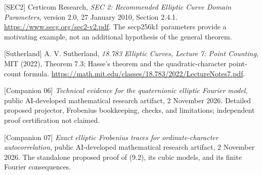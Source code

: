 \documentclass[
  11pt,
  a4paper,
]{article}
\begin{document}
{[}SEC2{]} Certicom Research, \emph{SEC 2: Recommended Elliptic Curve
Domain Parameters}, version 2.0, 27 January 2010, Section 2.4.1.
\url{https://www.secg.org/sec2-v2.pdf}. The secp256k1 parameters provide a
motivating example, not an additional hypothesis of the general theorem.


[Sutherland] A. V. Sutherland, \emph{18.783 Elliptic Curves, Lecture 7:
Point Counting}, MIT (2022), Theorem 7.3; Hasse's theorem and the
quadratic-character point-count formula.
\url{https://math.mit.edu/classes/18.783/2022/LectureNotes7.pdf}.

[Companion 06] \emph{Technical evidence for the quaternionic elliptic
Fourier model}, public AI-developed mathematical research artifact,
2 November 2026. Detailed proposed projector, Frobenius bookkeeping,
checks, and limitations; independent proof certification not claimed.

[Companion 07] \emph{Exact elliptic Frobenius traces for
ordinate-character autocorrelation}, public AI-developed mathematical
research artifact, 2 November 2026. The standalone proposed proof of
(9.2), its cubic models, and its finite Fourier consequences.
\end{document}
